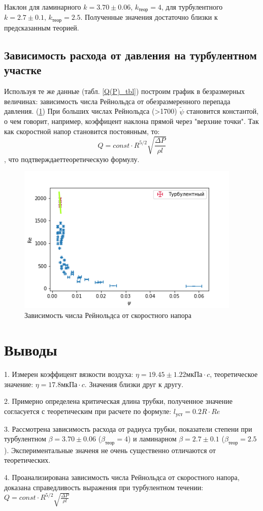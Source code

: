 \documentclass[a4paper,12pt]{article} %
\begin{document}
Наклон для ламинарного $k = 3.70 \pm 0.06$, $k_{теор} = 4$, для турбулентного $k = 2.7 \pm 0.1$, $k_{теор} = 2.5$. Полученные значения достаточно близки к предсказанным теорией.  

\subsection{Зависимость расхода от давления на турбулентном участке}
Используя те же данные (табл. \ref{Q(P)_tbl})  построим график в безразмерных величинах: зависимость числа Рейнольдса от обезразмеренного перепада давления. (\ref{Re(psi)}) При больших числах Рейнольдса (>1700) $\tilde{\psi}$ становится константой, о чем говорит, например, коэффицент наклона прямой через "верхние точки". Так как скоростной напор становится постоянным, то:
\begin{equation}
Q = const \cdot R^{5/2} \sqrt{\frac{\Delta P}{\rho l}}
\end{equation},
что подтверждаеттеоретическую формулу.
\begin{figure}[h!]
\begin{center}
\includegraphics[width=0.95\textwidth]{Re(psi)}
\end{center}
\caption{Зависимость числа Рейнольдса от скоростного напора} \label{Re(psi)}
\end{figure}

\section{Выводы}
\hspace*{20mm}
1. Измерен коэффицент вязкости воздуха: $\eta = 19.45 \pm 1.22 мкПа \cdot c$, теоретическое значение: $\eta = 17.8 мкПа \cdot c$. Значения близки друг к другу.

2. Примерно определена критическая длина трубки, полученное значение согласуется с теоретическим при расчете по формуле: $l_{уст} = 0.2R\cdot Re$

3. Рассмотрена зависимость расхода от радиуса трубки, показатели степени при турбулентном $\beta = 3.70 \pm 0.06$ ($\beta_{теор} = 4$) и ламинарном $\beta = 2.7 \pm 0.1$ ($\beta_{теор} = 2.5$). Экспериментальные значеня не очень существенно отличаются от теоретических.

4. Проанализирована зависимость числа Рейнольдса от скоростного напора, доказана справедливость выражения при турбулентном течении: $Q = const \cdot R^{5/2} \sqrt{\frac{\Delta P}{\rho l}}$ 
\end{document}

